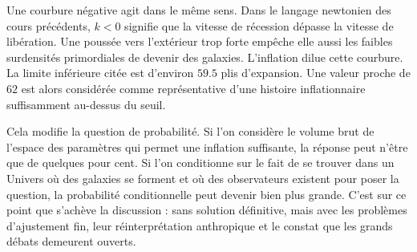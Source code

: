 Une courbure négative agit dans le même sens. Dans le langage newtonien des cours précédents, \(k<0\) signifie que la vitesse de récession dépasse la vitesse de libération. Une poussée vers l’extérieur trop forte empêche elle aussi les faibles surdensités primordiales de devenir des galaxies. L’inflation dilue cette courbure. La limite inférieure citée est d’environ \(59.5\) plis d’expansion. Une valeur proche de \(62\) est alors considérée comme représentative d’une histoire inflationnaire suffisamment au-dessus du seuil.

Cela modifie la question de probabilité. Si l’on considère le volume brut de l’espace des paramètres qui permet une inflation suffisante, la réponse peut n’être que de quelques pour cent. Si l’on conditionne sur le fait de se trouver dans un Univers où des galaxies se forment et où des observateurs existent pour poser la question, la probabilité conditionnelle peut devenir bien plus grande. C’est sur ce point que s’achève la discussion : sans solution définitive, mais avec les problèmes d’ajustement fin, leur réinterprétation anthropique et le constat que les grands débats demeurent ouverts.
